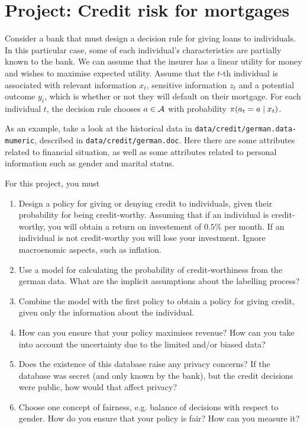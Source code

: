 \section{Project: Credit risk for mortgages}

Consider a bank that must design a decision rule for giving loans to individuals. In this particular case, some of each individual's characteristics are partially known to the bank.  We can assume that the insurer has a linear utility for money and wishes to maximise expected utility. Assume that the $t$-th individual is associated with relevant information $x_t$, sensitive information $z_t$ and a potential outcome $y_t$, which is whether or not they will default on their mortgage. For each individual $t$, the decision rule chooses $a \in {\mathcal{A}}$ with probability $\pi(a_t = a \mid x_t)$.

As an example, take a look at the historical data in \texttt{data/credit/german.data-mumeric}, described in \texttt{data/credit/german.doc}. Here there are some attributes related to financial situation, as well as some attributes related to personal information such as gender and marital status. 

For this project, you must
\begin{enumerate}
\item Design a policy for giving or denying credit to individuals, given their probability for being credit-worthy. Assuming that if an individual is credit-worthy, you will obtain a return on investement of $0.5\%$ per month. If an individual is not credit-worthy you will lose your investment. Ignore macroenomic aspects, such as inflation.
\item Use a model for calculating the probability of credit-worthiness from the german data. What are the implicit assumptions about the labelling process?
\item Combine the model with the first policy to obtain a policy for giving credit, given only the information about the individual.
\item How can you ensure that your policy maximises revenue? How can you take into account the uncertainty due to the limited and/or biased data?
\item Does the existence of this database raise any privacy concerns? If the database was secret (and only known by the bank), but the credit decisions were public, how would that affect privacy?
\item Choose one concept of fairness, e.g. balance of decisions with respect to gender. How do you ensure that your policy is fair? How can you measure it?
\end{enumerate}


